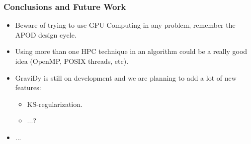 \begin{frame}
    \frametitle{Conclusions and Future Work}
    \begin{itemize}
        \item Beware of trying to use GPU Computing in any problem,
            remember the APOD design cycle.
        \item Using more than one HPC technique in an algorithm
            could be a really good idea (OpenMP, POSIX threads, etc).
        \item GraviDy is still on development and we are planning
            to add a lot of new features:
        \begin{itemize}
            \item KS-regularization.
            \item ...?
        \end{itemize}
        \item ...
    \end{itemize}
\end{frame}
